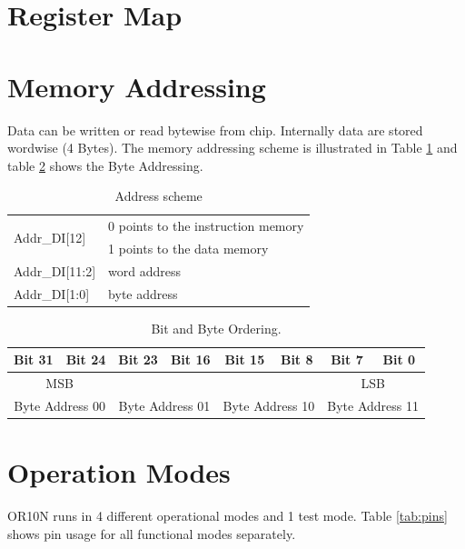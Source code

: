 \section{Register Map}

\section{Memory Addressing}
\label{sec:mem_addr}
Data can be written or read bytewise from chip. Internally data are stored wordwise (4 Bytes). The memory addressing scheme is illustrated in Table \ref{tab:addr_scheme} and table \ref{tab:byteorder} shows the Byte Addressing. 
\begin{table}[htbp]
 \caption{Address scheme}
 \label{tab:addr_scheme}
\centering\begin{tabular}{|l| l|} \hline
 \multirow{2}{*}{Addr\_DI[12]} & 0 points to the instruction memory \\ 
                               & 1 points to the data memory \\ \hline
 Addr\_DI[11:2] & word address \\ \hline
 Addr\_DI[1:0] & byte address \\ \hline

 \end{tabular}
\end{table}

\begin{table}[htbp]
 \caption{Bit and Byte Ordering. \cite{or1000}}
 \label{tab:byteorder}
\centering\begin{tabular}{|c c|c c|c c|c c|} \hline
 Bit 31 & Bit 24 & Bit 23 & Bit 16 & Bit 15 & Bit 8 & Bit 7 & Bit 0 \\ \hline
\multicolumn{2}{|c|}{MSB} & & & & & \multicolumn{2}{|c|}{LSB} \\ \hline
\multicolumn{2}{|c|}{Byte Address 00} & \multicolumn{2}{|c|}{Byte Address 01} & \multicolumn{2}{|c|}{Byte Address 10} & \multicolumn{2}{|c|}{Byte Address 11} \\ \hline 

 \end{tabular}
\end{table}



\section{Operation Modes}
\label{sec:mode}
OR10N runs in 4 different operational modes and 1 test mode. Table \ref{tab:pins} shows pin usage for all functional modes separately.
